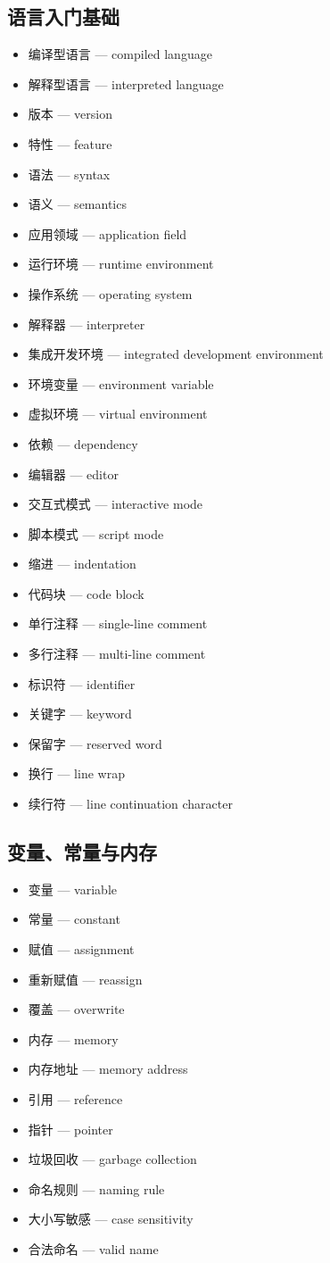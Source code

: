 \subsection{语言入门基础}
\begin{itemize}
\item 编译型语言 — compiled language
\item 解释型语言 — interpreted language
\item 版本 — version
\item 特性 — feature
\item 语法 — syntax
\item 语义 — semantics
\item 应用领域 — application field
\item 运行环境 — runtime environment
\item 操作系统 — operating system
\item 解释器 — interpreter
\item 集成开发环境 — integrated development environment
\item 环境变量 — environment variable
\item 虚拟环境 — virtual environment
\item 依赖 — dependency
\item 编辑器 — editor
\item 交互式模式 — interactive mode
\item 脚本模式 — script mode
\item 缩进 — indentation
\item 代码块 — code block
\item 单行注释 — single-line comment
\item 多行注释 — multi-line comment
\item 标识符 — identifier
\item 关键字 — keyword
\item 保留字 — reserved word
\item 换行 — line wrap
\item 续行符 — line continuation character
\end{itemize}

\subsection{变量、常量与内存}
\begin{itemize}
\item 变量 — variable
\item 常量 — constant
\item 赋值 — assignment
\item 重新赋值 — reassign
\item 覆盖 — overwrite
\item 内存 — memory
\item 内存地址 — memory address
\item 引用 — reference
\item 指针 — pointer
\item 垃圾回收 — garbage collection
\item 命名规则 — naming rule
\item 大小写敏感 — case sensitivity
\item 合法命名 — valid name
\end{itemize}

